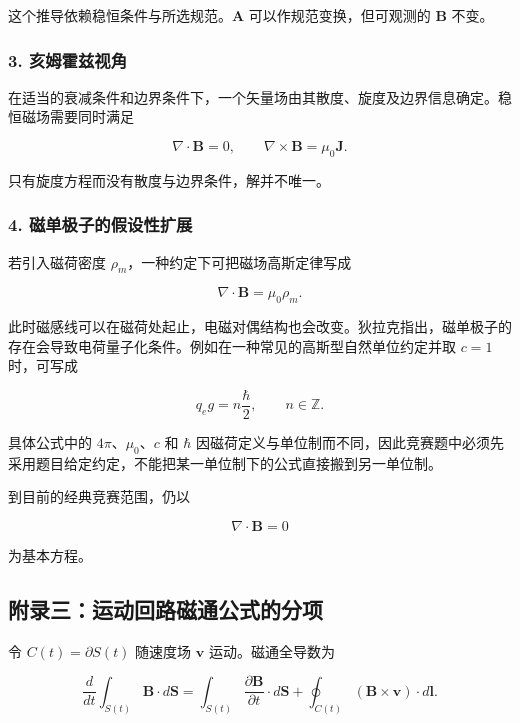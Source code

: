这个推导依赖稳恒条件与所选规范。\(\mathbf A\) 可以作规范变换，但可观测的
\(\mathbf B\) 不变。

\subsubsection{3.
亥姆霍兹视角}\label{m7:ux4ea5ux59c6ux970dux5179ux89c6ux89d2}

在适当的衰减条件和边界条件下，一个矢量场由其散度、旋度及边界信息确定。稳恒磁场需要同时满足

\[
\nabla\cdot\mathbf B=0,
\qquad
\nabla\times\mathbf B=\mu_0\mathbf J.
\]

只有旋度方程而没有散度与边界条件，解并不唯一。

\subsubsection{4.
磁单极子的假设性扩展}\label{m7:ux78c1ux5355ux6781ux5b50ux7684ux5047ux8bbeux6027ux6269ux5c55}

若引入磁荷密度 \(\rho_m\)，一种约定下可把磁场高斯定律写成

\[
\nabla\cdot\mathbf B=\mu_0\rho_m.
\]

此时磁感线可以在磁荷处起止，电磁对偶结构也会改变。狄拉克指出，磁单极子的存在会导致电荷量子化条件。例如在一种常见的高斯型自然单位约定并取
\(c=1\) 时，可写成

\[
q_eg=n\frac{\hbar}{2},
\qquad n\in\mathbb Z.
\]

具体公式中的 \(4\pi\)、\(\mu_0\)、\(c\) 和 \(\hbar\)
因磁荷定义与单位制而不同，因此竞赛题中必须先采用题目给定约定，不能把某一单位制下的公式直接搬到另一单位制。

到目前的经典竞赛范围，仍以

\[
\nabla\cdot\mathbf B=0
\]

为基本方程。

\subsection{附录三：运动回路磁通公式的分项}\label{m7:ux9644ux5f55ux4e09ux8fd0ux52a8ux56deux8defux78c1ux901aux516cux5f0fux7684ux5206ux9879}

令 \(C(t)=\partial S(t)\) 随速度场 \(\mathbf v\) 运动。磁通全导数为

\[
\boxed{
\frac d{dt}
\int_{S(t)}\mathbf B\cdot d\mathbf S
=\int_{S(t)}
\frac{\partial\mathbf B}{\partial t}
\cdot d\mathbf S
+\oint_{C(t)}
(\mathbf B\times\mathbf v)\cdot d\mathbf l
}.
\]


